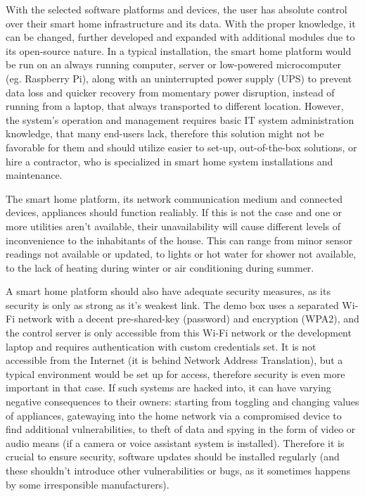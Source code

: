 With the selected software platforms and devices, the user has absolute control over their smart home infrastructure and its data. With the proper knowledge, it can be changed, further developed and expanded with additional modules due to its open-source nature. In a typical installation, the smart home platform would be run on an always running computer, server or low-powered microcomputer (eg. Raspberry Pi), along with an uninterrupted power supply (UPS) to prevent data loss and quicker recovery from momentary power disruption, instead of running from a laptop, that always transported to different location. However, the system's operation and management requires basic IT system administration knowledge, that many end-users lack, therefore this solution might not be favorable for them and should utilize easier to set-up, out-of-the-box solutions, or hire a contractor, who is specialized in smart home system installations and maintenance.

The smart home platform, its network communication medium and connected devices, appliances should function realiably. If this is not the case and one or more utilities aren't available, their unavailability will cause different levels of inconvenience to the inhabitants of the house. This can range from minor sensor readings not available or updated, to lights or hot water for shower not available, to the lack of heating during winter or air conditioning during summer.

A smart home platform should also have adequate security measures, as its security is only as strong as it's weakest link. The demo box uses a separated Wi-Fi network with a decent pre-shared-key (password) and encryption (WPA2), and the control server is only accessible from this Wi-Fi network or the development laptop and requires authentication with custom credentials set. It is not accessible from the Internet (it is behind Network Address Translation), but a typical environment would be set up for access, therefore security is even more important in that case. If such systems are hacked into, it can have varying negative consequences to their owners: starting from toggling and changing values of appliances, gatewaying into the home network via a compromised device to find additional vulnerabilities, to theft of data and spying in the form of video or audio means (if a camera or voice assistant system is installed). Therefore it is crucial to ensure security, software updates should be installed regularly (and these shouldn't introduce other vulnerabilities or bugs, as it sometimes happens by some irresponsible manufacturers).

